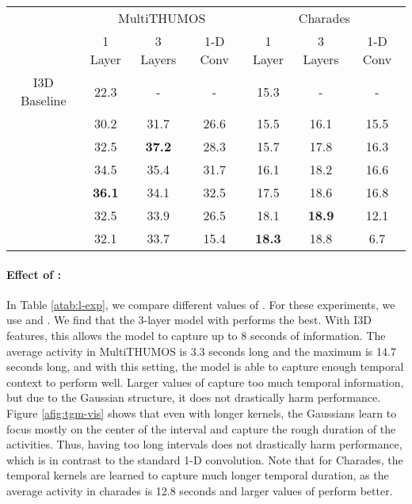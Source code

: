 \documentclass{article}
\begin{document}
\begin{table*}
\caption{Effect of  on MultiTHUMOS and Charades using only RGB I3D features. Note that the 3 TGM layer models have larger temporal resolution than the 1 TGM layer models for the same values of . We also compare to using standard one-layer 1-D conv layer with different values of .}
\label{atab:l-exp}
\centering
\begin{tabular}{c|ccc||ccc}
\toprule
 & \multicolumn{3}{c||}{MultiTHUMOS} & \multicolumn{3}{c}{Charades} \\
 &  1 Layer & 3 Layers & 1-D Conv & 1 Layer & 3 Layers & 1-D Conv \\
\midrule
I3D Baseline   & 22.3 & -      & -     & 15.3 & - & - \\
      & 30.2 &  31.7      & 26.6  & 15.5 & 16.1 & 15.5 \\
      & 32.5 &  \bf{37.2} & 28.3  & 15.7 & 17.8 & 16.3 \\
     & 34.5 &  35.4      & 31.7  & 16.1 & 18.2 & 16.6 \\
     & \bf{36.1} &  34.1 & 32.5  & 17.5 & 18.6 & 16.8 \\
     & 32.5 &  33.9      & 26.5  & 18.1 & \bf{18.9} & 12.1 \\
     & 32.1 &  33.7      & 15.4  & \bf{18.3} & 18.8 & 6.7 \\
\bottomrule
\end{tabular}
\end{table*}

\paragraph{Effect of :} In Table \ref{atab:l-exp}, we compare different values of . For these experiments, we use  and . We find that the 3-layer model with  performs the best. With I3D features, this allows the model to capture up to 8 seconds of information. The average activity in MultiTHUMOS is 3.3 seconds long and the maximum is 14.7 seconds long, and with this setting, the model is able to capture enough temporal context to perform well. Larger values of  capture too much temporal information, but due to the Gaussian structure, it does not drastically harm performance. Figure \ref{afig:tgm-vis} shows that even with longer kernels, the Gaussians learn to focus mostly on the center of the interval and capture the rough duration of the activities. Thus, having too long intervals does not drastically harm performance, which is in contrast to the standard 1-D convolution. Note that for Charades, the temporal kernels are learned to capture much longer temporal duration, as the average activity in charades is 12.8 seconds and larger values of  perform better.
\end{document}
